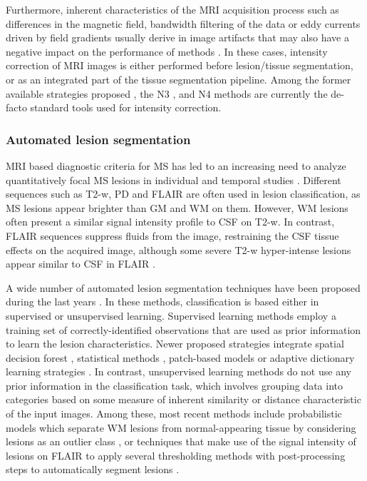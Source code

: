 Furthermore, inherent characteristics of the MRI acquisition process such as differences in the magnetic field, bandwidth filtering of the data or eddy currents driven by field gradients usually derive in image artifacts that may also have a negative impact on the performance of methods \cite{Simmons1994}. In these cases,
intensity correction of MRI images is either performed before lesion/tissue segmentation, or as an integrated part of the tissue segmentation pipeline.  Among the former available strategies proposed \cite{Arnold2001,Hou2006}, the N3 \cite{Sled1998}, and N4 \cite{Tustison2010} methods are currently the de-facto standard tools used for intensity correction. 


\subsubsection{Automated lesion segmentation}

MRI based diagnostic criteria for MS has led to an increasing need to analyze quantitatively focal MS lesions in individual and temporal studies \cite{Cabezas2014, Polman2011}. Different sequences such as T2-w, PD and FLAIR are often used in lesion classification, as MS lesions appear brighter than GM and WM on them. However, WM lesions often present a similar signal intensity profile to CSF on T2-w. In contrast, FLAIR sequences suppress fluids from the image, restraining the CSF tissue effects on the acquired image, although some severe T2-w hyper-intense lesions appear similar to CSF in FLAIR \cite{Harmouche2015}. 

A wide number of automated lesion segmentation techniques have been proposed during the last years \cite{Garcia-Lorenzo2013, Llado2012}. In these methods, classification is based either in supervised or unsupervised learning. Supervised learning methods employ a training set of correctly-identified observations that are used as prior information to learn the lesion characteristics. Newer proposed strategies integrate spatial decision forest \cite{Geremia2011}, statistical methods \cite{Sweeney2013}, patch-based models \cite{Guizard2015} or adaptive dictionary learning strategies \cite{Deshpande2015}. In contrast, unsupervised learning methods do not use any prior information in the classification task, which involves grouping data into categories based on some measure of inherent similarity or distance characteristic of the input images. Among these, most recent methods include probabilistic models which separate WM lesions from normal-appearing tissue by considering lesions as an outlier class \cite{Harmouche2015,Jain2015,Tomas-Fernandez2015}, or techniques that make use of the signal intensity of lesions on FLAIR to apply several thresholding methods with post-processing steps to automatically segment lesions \cite{Roura2015, Schmidt2012}. 


